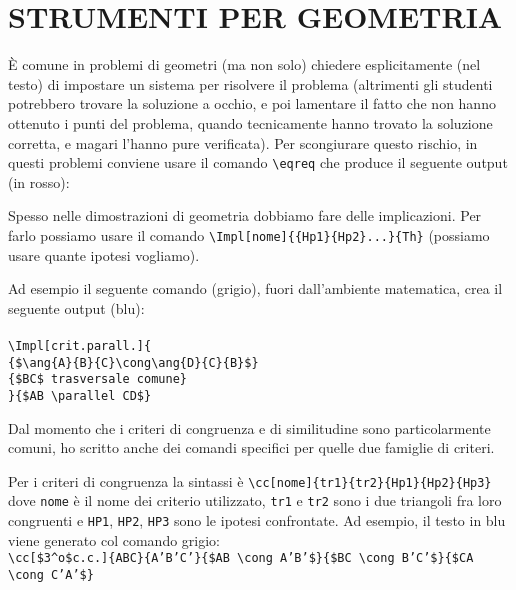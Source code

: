 \documentclass[italian, a4paper]{article}
\newcommand{\bs}{\textbackslash}
\newcommand{\ttt}[1]{\texttt{#1}}
\begin{document}
\section{STRUMENTI PER GEOMETRIA}
È comune in problemi di geometri (ma non solo) chiedere esplicitamente (nel testo) di impostare un sistema per risolvere il problema (altrimenti gli studenti potrebbero trovare la soluzione a occhio, e poi lamentare il fatto che non hanno ottenuto i punti del problema, quando tecnicamente hanno trovato la soluzione corretta, e magari l'hanno pure verificata). Per scongiurare questo rischio, in questi problemi conviene usare il comando \ttt{\bs eqreq} che produce il seguente output (in rosso):\\
\eqreq


Spesso nelle dimostrazioni di geometria dobbiamo fare delle implicazioni. Per farlo possiamo usare il comando \ttt{\bs Impl[nome]\{\{Hp1\}\{Hp2\}...\}\{Th\}} (possiamo usare quante ipotesi vogliamo).

Ad esempio il seguente comando (grigio), fuori dall'ambiente matematica, crea il seguente output (blu):\\\color{gray}\\
\ttt{\bs Impl[crit.parall.]\{}\\
\hspace*{5mm}\ttt{\{\$\bs ang\{A\}\{B\}\{C\}\bs cong\bs ang\{D\}\{C\}\{B\}\$\}}\\
\hspace*{5mm}\ttt{\{\$BC\$ trasversale comune\}}\\
\ttt{\}\{\$AB \bs parallel CD\$\}}\\
\color{blue}
\color{black}

Dal momento che i criteri di congruenza e di similitudine sono particolarmente comuni, ho scritto anche dei comandi specifici per quelle due famiglie di criteri.

Per i criteri di congruenza la sintassi è \ttt{\bs cc[nome]\{tr1\}\{tr2\}\{Hp1\}\{Hp2\}\{Hp3\}} dove \ttt{nome} è il nome dei criterio utilizzato, \ttt{tr1} e \ttt{tr2} sono i due triangoli fra loro congruenti e \ttt{HP1}, \ttt{HP2}, \ttt{HP3} sono le ipotesi confrontate. Ad esempio, il testo in blu viene generato col comando grigio:\color{gray}\\
\ttt{\bs cc[\$3\string^o\$c.c.]\{ABC\}\{A'B'C'\}\{\$AB \bs cong A'B'\$\}\{\$BC \bs cong B'C'\$\}\{\$CA \bs cong C'A'\$\}}\\
\color{blue}\color{black}
\end{document}
